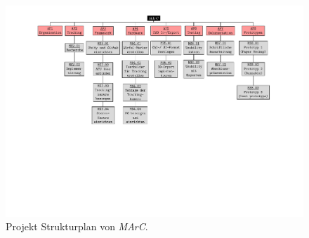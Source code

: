 \begin{figure}[htbp]
	\centering
	\includegraphics[angle=90,scale=.9, trim=1cm 1cm 3.5cm 1 cm]{kapitel/anhang/MP_Strukturplan.pdf}
	 \caption{Projekt Strukturplan von \textit{MArC}.}
	\label{fig:psp}
\end{figure}
\newpage




